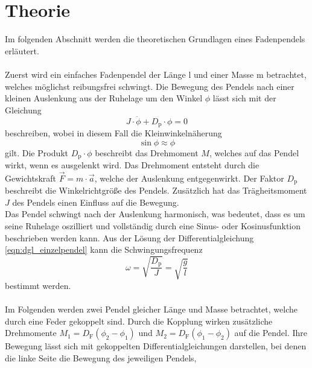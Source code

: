 \section{Theorie}
\label{sec:theorie}

    Im folgenden Abschnitt werden die theoretischen Grundlagen eines Fadenpendels erläutert.\\
    \\
    Zuerst wird ein einfaches Fadenpendel der Länge l und einer Masse m betrachtet,
    welches möglichst reibungsfrei schwingt.
    Die Bewegung des Pendels nach einer kleinen Auslenkung aus der Ruhelage um den Winkel $\phi$ lässt sich mit der Gleichung
    \begin{equation*}
        J \cdot \ddot{\phi} + D_\text{p} \cdot \phi = 0
        \label{eqn:dgl_einzelpendel}
    \end{equation*}
    beschreiben,
    wobei in diesem Fall die Kleinwinkelnäherung 
    \begin{equation}
        \sin{\phi} \approx \phi
        \label{eqn:kleinwinkelnaeherung}
    \end{equation}
    gilt.
    Die Produkt $D_\text{p} \cdot \phi$ beschreibt das Drehmoment $M$,
    welches auf das Pendel wirkt,
    wenn es ausgelenkt wird.
    Das Drehmoment entsteht durch die Gewichtskraft $\vec{F} = m \cdot \vec{a}$,
    welche der Auslenkung entgegenwirkt.
    Der Faktor $D_\text{p}$ beschreibt die Winkelrichtgröße des Pendels.
    Zusätzlich hat das Trägheitsmoment $J$ des Pendels einen Einfluss auf die Bewegung.\\
    Das Pendel schwingt nach der Auslenkung harmonisch,
    was bedeutet,
    dass es um seine Ruhelage oszilliert und vollständig durch eine Sinus- oder Kosinusfunktion beschrieben werden kann.
    Aus der Lösung der Differentialgleichung \eqref{eqn:dgl_einzelpendel} kann die Schwingungsfrequenz
    \begin{equation*}
        \omega = \sqrt{\frac{D_\text{p}}{J}} = \sqrt{\frac{g}{l}}
    \end{equation*}
    bestimmt werden.\\
    \\
    Im Folgenden werden zwei Pendel gleicher Länge und Masse betrachtet,
    welche durch eine Feder gekoppelt sind.
    Durch die Kopplung wirken zusätzliche Drehmomente $M_1 = D_\text{F}(\phi_2 - \phi_1)$ und $M_2 = D_\text{F}(\phi_1 - \phi_2)$ auf die Pendel.
    Ihre Bewegung lässt sich mit gekoppelten Differentialgleichungen darstellen,
    bei denen die linke Seite die Bewegung des jeweiligen Pendels,
